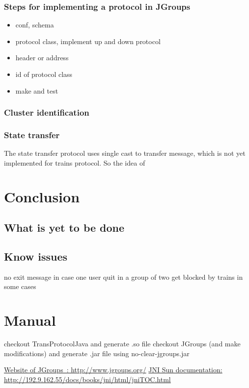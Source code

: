 \documentclass[a4paper,10pt]{report}
\begin{document}
\subsection{Steps for implementing a protocol in JGroups}
\begin{itemize}
\item conf, schema
\item protocol class, implement up and down protocol
\item header or address
\item id of protocol class
\item make and test
\end{itemize}

\subsection{Cluster identification}

\subsection{State transfer}
The state transfer protocol uses single cast to transfer message, which is not yet
implemented for trains protocol. So the idea of

\chapter{Conclusion}

\section{}

\section{What is yet to be done}
\section{Know issues}
no exit message in case one user quit in a group of two
get blocked by trains in some cases

\chapter{Manual}
checkout TransProtocolJava and generate .so file
checkout JGroups (and make modifications) and generate .jar file using no-clear-jgroups.jar

\listoffigures

\begin{thebibliography}{99}
   \href{http://www.jgroups.org/}{Website of JGroups~: http://www.jgroups.org/}
   \href{http://192.9.162.55/docs/books/jni/html/jniTOC.html}{JNI Sun documentation: http://192.9.162.55/docs/books/jni/html/jniTOC.html}
\end{thebibliography}
\end{document}
